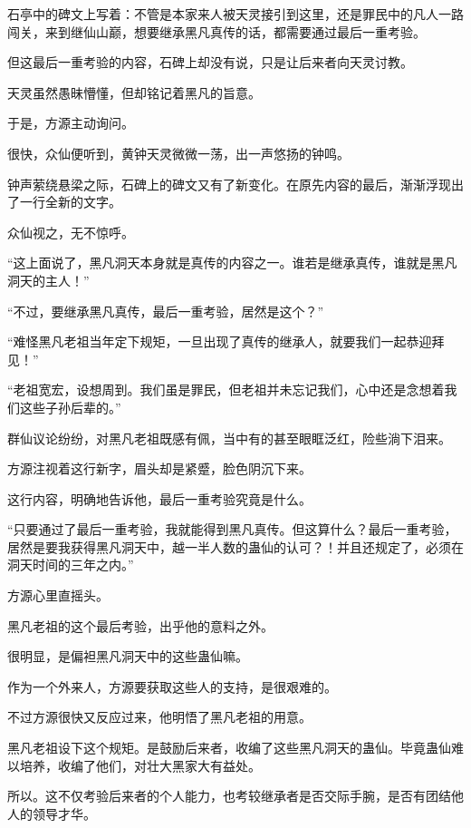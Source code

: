 
\begin{this_body}

石亭中的碑文上写着：不管是本家来人被天灵接引到这里，还是罪民中的凡人一路闯关，来到继仙山巅，想要继承黑凡真传的话，都需要通过最后一重考验。

但这最后一重考验的内容，石碑上却没有说，只是让后来者向天灵讨教。

天灵虽然愚昧懵懂，但却铭记着黑凡的旨意。

于是，方源主动询问。

很快，众仙便听到，黄钟天灵微微一荡，出一声悠扬的钟鸣。

钟声萦绕悬梁之际，石碑上的碑文又有了新变化。在原先内容的最后，渐渐浮现出了一行全新的文字。

众仙视之，无不惊呼。

“这上面说了，黑凡洞天本身就是真传的内容之一。谁若是继承真传，谁就是黑凡洞天的主人！”

“不过，要继承黑凡真传，最后一重考验，居然是这个？”

“难怪黑凡老祖当年定下规矩，一旦出现了真传的继承人，就要我们一起恭迎拜见！”

“老祖宽宏，设想周到。我们虽是罪民，但老祖并未忘记我们，心中还是念想着我们这些子孙后辈的。”

群仙议论纷纷，对黑凡老祖既感有佩，当中有的甚至眼眶泛红，险些淌下泪来。

方源注视着这行新字，眉头却是紧蹙，脸色阴沉下来。

这行内容，明确地告诉他，最后一重考验究竟是什么。

“只要通过了最后一重考验，我就能得到黑凡真传。但这算什么？最后一重考验，居然是要我获得黑凡洞天中，越一半人数的蛊仙的认可？！并且还规定了，必须在洞天时间的三年之内。”

方源心里直摇头。

黑凡老祖的这个最后考验，出乎他的意料之外。

很明显，是偏袒黑凡洞天中的这些蛊仙嘛。

作为一个外来人，方源要获取这些人的支持，是很艰难的。

不过方源很快又反应过来，他明悟了黑凡老祖的用意。

黑凡老祖设下这个规矩。是鼓励后来者，收编了这些黑凡洞天的蛊仙。毕竟蛊仙难以培养，收编了他们，对壮大黑家大有益处。

所以。这不仅考验后来者的个人能力，也考较继承者是否交际手腕，是否有团结他人的领导才华。


\end{this_body}

